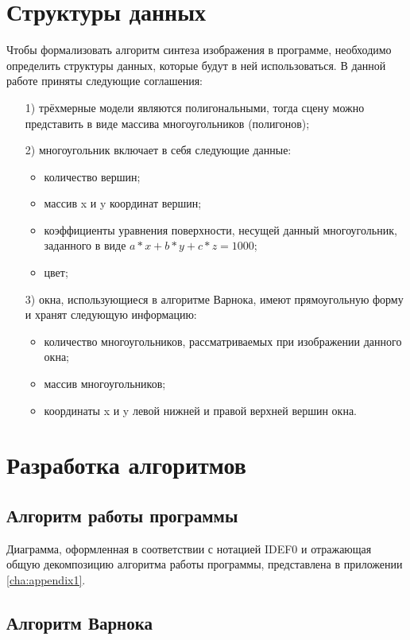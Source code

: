 \section{Структуры данных}
Чтобы формализовать алгоритм синтеза изображения в программе, необходимо определить структуры данных, которые будут в ней использоваться. 
В данной работе приняты следующие соглашения:
\begin{enumerate}
	\item[1)] трёхмерные модели являются полигональными, тогда сцену можно представить в виде массива многоугольников (полигонов);
	\item[2)] многоугольник включает в себя следующие данные:
	\begin{itemize}
		\item количество вершин;
		\item массив x и y координат вершин;
		\item коэффициенты уравнения поверхности, несущей данный многоугольник, заданного в виде $a*x + b*y + c*z = 1000$;
		\item цвет;
	\end{itemize}
	\item[3)] окна, использующиеся в алгоритме Варнока, имеют прямоугольную форму и хранят следующую информацию:
	\begin{itemize}
		\item количество многоугольников, рассматриваемых при изображении данного окна;
		\item массив многоугольников;
		\item координаты x и y левой нижней и правой верхней вершин окна.
	\end{itemize}
\end{enumerate}

\section{Разработка алгоритмов}
\subsection{Алгоритм работы программы}
Диаграмма, оформленная в соответствии с нотацией IDEF0 и отражающая общую декомпозицию алгоритма работы программы, представлена в 
приложении \ref{cha:appendix1}.


\subsection{Алгоритм Варнока}

